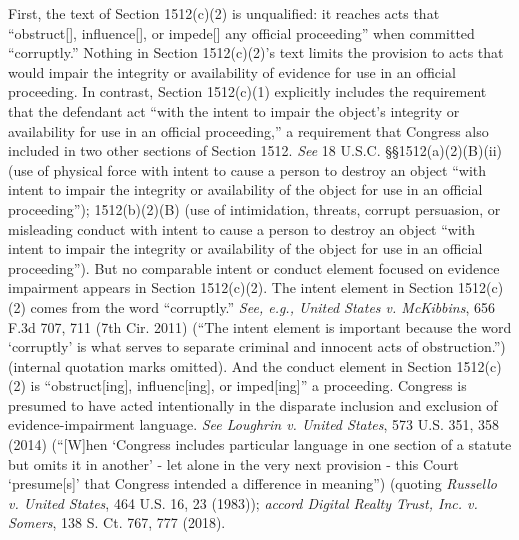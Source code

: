 First, the text of Section 1512(c)(2) is unqualified: it reaches acts that “obstruct[], influence[], or impede[] any official proceeding” when committed “corruptly.”
Nothing in Section 1512(c)(2)’s text limits the provision to acts that would impair the integrity or availability of evidence for use in an official proceeding.
In contrast, Section 1512(c)(1) explicitly includes the requirement that the defendant act “with the intent to impair the object’s integrity or availability for use in an official proceeding,” a requirement that Congress also included in two other sections of Section 1512.
\textit{See} 18 U.S.C. \S\S 1512(a)(2)(B)(ii) (use of physical force with intent to cause a person to destroy an object “with intent to impair the integrity or availability of the object for use in an official proceeding”);
1512(b)(2)(B) (use of intimidation, threats, corrupt persuasion, or misleading conduct with intent to cause a person to destroy an object “with intent to impair the integrity or availability of the object for use in an official proceeding”).
But no comparable intent or conduct element focused on evidence impairment appears in Section 1512(c)(2).
The intent element in Section 1512(c)(2) comes from the word “corruptly.”
\textit{See, e.g., United States v. McKibbins}, 656 F.3d 707, 711 (7th Cir. 2011) (“The intent element is important because the word ‘corruptly’ is what serves to separate criminal and innocent acts of obstruction.”) (internal quotation marks omitted).
And the conduct element in Section 1512(c)(2) is “obstruct[ing], influenc[ing], or imped[ing]” a proceeding.
Congress is presumed to have acted intentionally in the disparate inclusion and exclusion of evidence-impairment language.
\textit{See Loughrin v. United States}, 573 U.S. 351, 358 (2014) (“[W]hen ‘Congress includes particular language in one section of a statute but omits it in another’ - let alone in the very next provision - this Court ‘presume[s]’ that Congress intended a difference in meaning”) (quoting \textit{Russello v. United States}, 464 U.S. 16, 23 (1983));
\textit{accord Digital Realty Trust, Inc. v. Somers}, 138 S. Ct. 767, 777 (2018).

